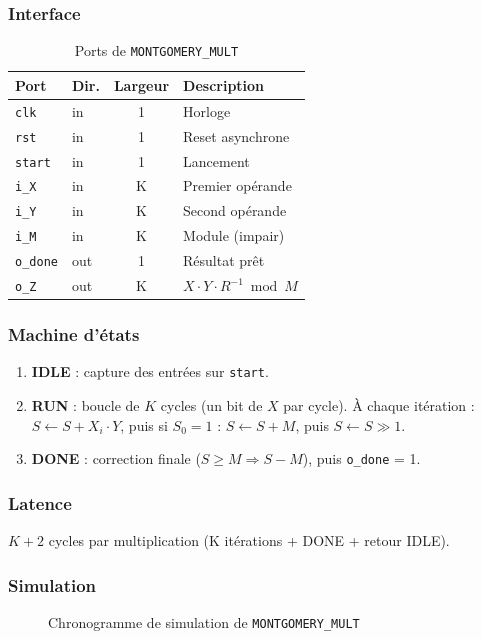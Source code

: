 \subsubsection{Interface}
\begin{table}[H]
\centering
\caption{Ports de \texttt{MONTGOMERY\_MULT}}
\begin{tabular}{llcp{5cm}}
\toprule
\textbf{Port} & \textbf{Dir.} & \textbf{Largeur} & \textbf{Description} \\
\midrule
\texttt{clk}    & in  & 1 & Horloge \\
\texttt{rst}    & in  & 1 & Reset asynchrone \\
\texttt{start}  & in  & 1 & Lancement \\
\texttt{i\_X}   & in  & K & Premier opérande \\
\texttt{i\_Y}   & in  & K & Second opérande \\
\texttt{i\_M}   & in  & K & Module (impair) \\
\texttt{o\_done} & out & 1 & Résultat prêt \\
\texttt{o\_Z}    & out & K & $X \cdot Y \cdot R^{-1} \bmod M$ \\
\bottomrule
\end{tabular}
\end{table}


\subsubsection{Machine d'états}
\begin{enumerate}
  \item \textbf{IDLE} : capture des entrées sur \texttt{start}.
  \item \textbf{RUN} : boucle de $K$ cycles (un bit de $X$ par cycle).
        À chaque itération :
        $S \leftarrow S + X_i \cdot Y$, puis
        si $S_0 = 1$ : $S \leftarrow S + M$, puis
        $S \leftarrow S \gg 1$.
  \item \textbf{DONE} : correction finale ($S \geq M \Rightarrow S - M$),
        puis \texttt{o\_done} = 1.
\end{enumerate}

\subsubsection{Latence}
$K + 2$ cycles par multiplication (K itérations + DONE + retour IDLE).

\subsubsection{Simulation}
\begin{figure}[H]
\centering
{}
\caption{Chronogramme de simulation de \texttt{MONTGOMERY\_MULT}}
\label{fig:sim_mont}
\end{figure}

